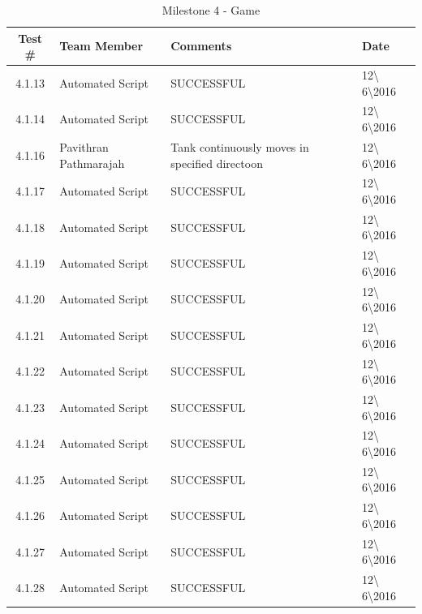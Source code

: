 \documentclass{article}
\begin{document}
\begin{table}[H]
\caption{Milestone 4 - Game}
	\begin{tabularx}{\textwidth}{| c | l | X | l |}
	\toprule
	Test \#& Team Member &Comments &Date\\
	\midrule
	4.1.13 & Automated Script  & SUCCESSFUL & 12\textbackslash
	6\textbackslash2016\\
	4.1.14 & Automated Script  & SUCCESSFUL & 12\textbackslash
	6\textbackslash2016\\
	4.1.16 & Pavithran Pathmarajah
	  & Tank continuously moves in specified directoon & 
	  12\textbackslash
	6\textbackslash2016\\
	4.1.17 & Automated Script  & SUCCESSFUL & 12\textbackslash
	6\textbackslash2016\\
	4.1.18 & Automated Script  & SUCCESSFUL & 12\textbackslash
	6\textbackslash2016\\
	4.1.19 & Automated Script  & SUCCESSFUL & 12\textbackslash
	6\textbackslash2016\\
	4.1.20 & Automated Script  & SUCCESSFUL & 12\textbackslash
	6\textbackslash2016\\
	4.1.21 & Automated Script  & SUCCESSFUL & 12\textbackslash
	6\textbackslash2016\\
	4.1.22 & Automated Script  & SUCCESSFUL & 12\textbackslash
	6\textbackslash2016\\
	4.1.23 & Automated Script  & SUCCESSFUL & 12\textbackslash
	6\textbackslash2016\\
	4.1.24 & Automated Script  & SUCCESSFUL & 12\textbackslash
	6\textbackslash2016\\
	4.1.25 & Automated Script  & SUCCESSFUL & 12\textbackslash
	6\textbackslash2016\\
	4.1.26 & Automated Script  & SUCCESSFUL & 12\textbackslash
	6\textbackslash2016\\
	4.1.27 & Automated Script  & SUCCESSFUL & 12\textbackslash
	6\textbackslash2016\\
	4.1.28 & Automated Script  & SUCCESSFUL & 12\textbackslash
	6\textbackslash2016\\	\bottomrule
	\end{tabularx}
\end{table}
\end{document}
